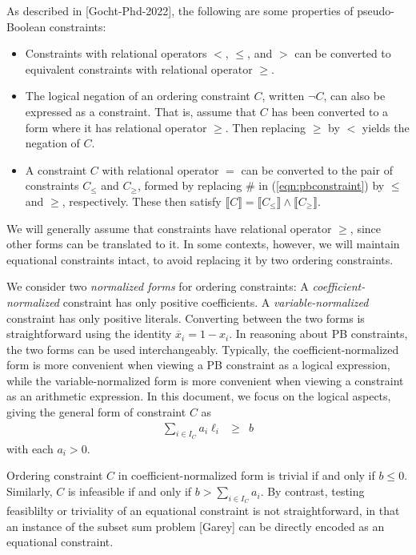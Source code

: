 \documentclass{easychair}
\newcommand{\boolnot}{\neg}
\renewcommand{\obar}[1]{\overline{#1}}
\newcommand{\lit}{\ell}
\newcommand{\indices}{I}
\newcommand{\func}[1]{\llbracket#1\rrbracket}
\begin{document}
As described in [Gocht-Phd-2022], the following are some properties of pseudo-Boolean constraints:
\begin{itemize}
\item Constraints with relational operators $<$, $\leq$, and $>$ can be
  converted to equivalent constraints with relational operator $\geq$.
\item
The logical negation of an ordering constraint $C$, written $\boolnot C$,
can also be expressed as a constraint.  That is, assume that $C$
has been converted to a form where it has relational operator $\geq$.
Then replacing $\geq$ by $<$ yields the negation of $C$.  
\item
A constraint $C$ with relational operator $=$ can be converted to the
pair of constraints $C_{\leq}$ and $C_{\geq}$, formed by replacing
$\#$ in (\ref{eqn:pbconstraint}) by $\leq$ and $\geq$, respectively.
These then satisfy $\func{C} = \func{C_{\leq}} \land \func{C_{\geq}}$.
\end{itemize}
We will generally
assume that constraints have relational operator $\geq$, since other
forms can be translated to it.  In some contexts, however, we will
maintain equational constraints 
intact, to avoid replacing it by two ordering constraints.


We consider two {\em normalized forms} for ordering constraints: A
{\em coefficient-normalized} constraint has only positive
coefficients.  A {\em variable-normalized} constraint has only
positive literals.  Converting between the two forms is
straightforward using the identity $\obar{x}_i = 1-x_i$.  In reasoning
about PB constraints, the two forms can be used interchangeably.
Typically, the coefficient-normalized form is more convenient when
viewing a PB constraint as a logical expression, while the
variable-normalized form is more convenient when viewing a constraint
as an arithmetic expression.  In this document, we focus on the logical
aspects, giving the general form of constraint $C$ as
\begin{eqnarray}
\sum_{i \in \indices_C} a_{i} \lit_{i} & \geq & b \label{eqn:coeff-normalized}
\end{eqnarray}
with each $a_{i} > 0$.

Ordering constraint $C$ in coefficient-normalized form is trivial if and only
if $b \leq 0$.  Similarly, $C$ is infeasible if and only if
$b > \sum_{i \in \indices_C} {a_{i}}$.  By contrast, testing feasiblilty or triviality
of an equational constraint is not straightforward, in that an instance of the
subset sum problem [Garey] can be directly encoded as an equational
constraint.
\end{document}
